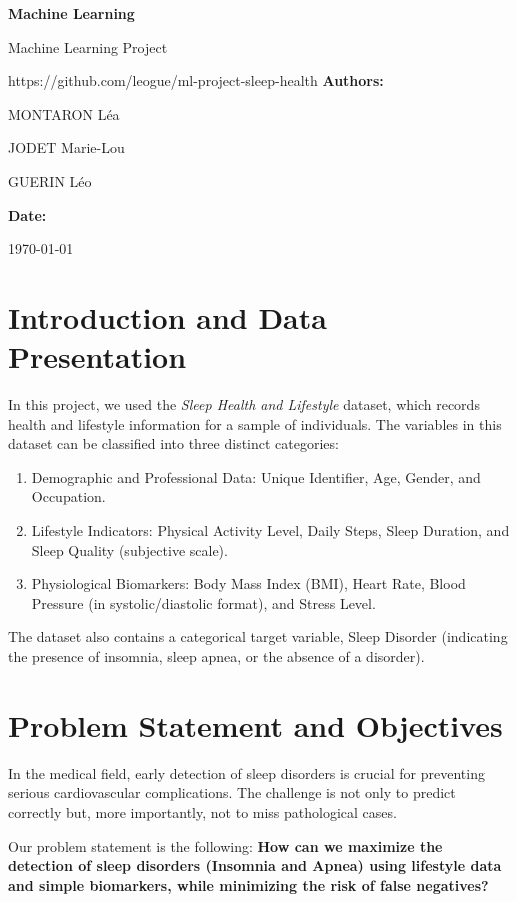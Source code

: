 \documentclass[12pt,a4paper]{article}
\newcommand{\coverpage}{
    \begin{titlepage}
    \centering
    {\Huge \bfseries Machine Learning \par}
    \vspace{0.7cm}
    {\large Machine Learning Project\par}
    \vspace{0.4cm}
    {https://github.com/leogue/ml-project-sleep-health}
    \vfill
    {\large\textbf{Authors:}}\par
    {\large MONTARON Léa\par
    JODET Marie-Lou\par
    GUERIN Léo\par

    }
    \vspace{2cm}
    {\large\textbf{Date:}}\par
    {\large\today}
    \end{titlepage}
}
\begin{document}
    \coverpage



    \newpage

    \section{Introduction and Data Presentation}

    In this project, we used the \textit{Sleep Health and Lifestyle} dataset, which records health and lifestyle information for a sample of individuals. The variables in this dataset can be classified into three distinct categories:

    \begin{enumerate}
        \item Demographic and Professional Data: Unique Identifier, Age, Gender, and Occupation.
        \item Lifestyle Indicators: Physical Activity Level, Daily Steps, Sleep Duration, and Sleep Quality (subjective scale).
        \item Physiological Biomarkers: Body Mass Index (BMI), Heart Rate, Blood Pressure (in systolic/diastolic format), and Stress Level.
    \end{enumerate}

    The dataset also contains a categorical target variable, Sleep Disorder (indicating the presence of insomnia, sleep apnea, or the absence of a disorder).

    
    
    \section{Problem Statement and Objectives}

    In the medical field, early detection of sleep disorders is crucial for preventing serious cardiovascular complications. The challenge is not only to predict correctly but, more importantly, not to miss pathological cases. \newline

    Our problem statement is the following:\newline
    \textbf{How can we maximize the detection of sleep disorders (Insomnia and Apnea) using lifestyle data and simple biomarkers, while minimizing the risk of false negatives?} \newline
\end{document}
